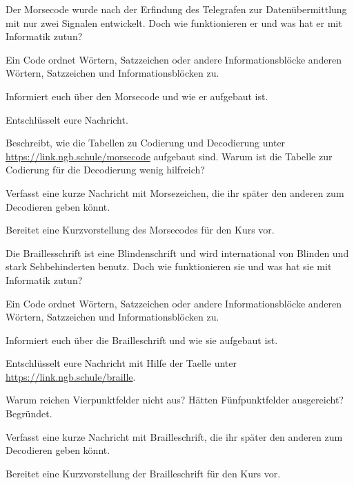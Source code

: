 \documentclass[10pt, a5paper, landscape, ngerman]{arbeitsblatt}
\begin{document}

Der Morsecode wurde nach der Erfindung des Telegrafen zur Datenübermittlung mit nur zwei Signalen entwickelt. Doch wie funktionieren er und was hat er mit Informatik zutun?

Ein Code ordnet Wörtern, Satzzeichen oder andere Informationsblöcke anderen Wörtern, Satzzeichen und Informationsblöcken zu.
\begin{enumn}
	\item Informiert euch über den Morsecode und wie er aufgebaut ist.
	\item Entschlüsselt eure Nachricht.
	\item Beschreibt, wie die Tabellen zu Codierung und Decodierung unter \url{https://link.ngb.schule/morsecode} aufgebaut sind. Warum ist die Tabelle zur Codierung für die Decodierung wenig hilfreich?
	\item Verfasst eine kurze Nachricht mit Morsezeichen, die ihr später den anderen zum Decodieren geben könnt.
	\item Bereitet eine Kurzvorstellung des Morsecodes für den Kurs vor.
\end{enumn}



\newpage
{}

Die Braillesschrift ist eine Blindenschrift und wird international von Blinden und stark Sehbehinderten benutz. Doch wie funktionieren sie und was hat sie mit Informatik zutun?

Ein Code ordnet Wörtern, Satzzeichen oder andere Informationsblöcke anderen Wörtern, Satzzeichen und Informationsblöcken zu.
\begin{enumn}
	\item Informiert euch über die Brailleschrift und wie sie aufgebaut ist.
	\item Entschlüsselt eure Nachricht mit Hilfe der Taelle unter \url{https://link.ngb.schule/braille}.
	\item Warum reichen Vierpunktfelder nicht aus? Hätten Fünfpunktfelder ausgereicht? Begründet.
	\item Verfasst eine kurze Nachricht mit Brailleschrift, die ihr später den anderen zum Decodieren geben könnt.
	\item Bereitet eine Kurzvorstellung der Brailleschrift für den Kurs vor.
\end{enumn}
\end{document}
